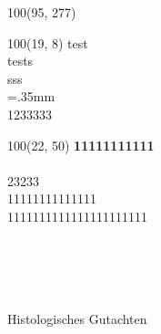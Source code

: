 \documentclass{scrartcl}
\begin{document}
 
 
\baselineskip10pt

\textblockorigin{0in}{0in}
\setlength{\TPHorizModule}{1mm}
\setlength{\TPVertModule}{1mm}

{
\begin{textblock}{100}(95, 277) 
%
\end{textblock}
}

{
\scriptsize
\begin{textblock}{100}(19, 8) 
\noindent test\\
tests\\
sss\\
\X=.35mm        
\barheight=1cm 
\\
1233333\\
\end{textblock}
}


{
\begin{textblock}{100}(22, 50) 
\noindent 
\textbf{11111111111} \\\\
23233\\
11111111111111\\
1111111111111111111111\\
\end{textblock}
}

~\\
\vspace{5.0cm}\\
\noindent\makebox[\linewidth]{\rule{\linewidth}{0.4pt}}\\\\
{\huge Histologisches Gutachten} \\
\end{document}
